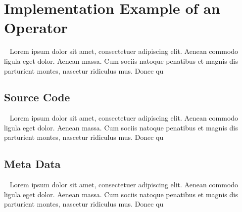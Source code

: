 \graphicspath{{appendix02/bilder/}}


\chapter{Implementation Example of an Operator}\label{chap:beispielimplementierung_operator}
~
Lorem ipsum dolor sit amet, consectetuer adipiscing elit. Aenean commodo ligula eget dolor. Aenean massa. Cum sociis natoque penatibus et magnis dis parturient montes, nascetur ridiculus mus. Donec qu

\section{Source Code}\label{chap:beispielimplementierung_operator_sec:quellcode_beispieloperator}
~
Lorem ipsum dolor sit amet, consectetuer adipiscing elit. Aenean commodo ligula eget dolor. Aenean massa. Cum sociis natoque penatibus et magnis dis parturient montes, nascetur ridiculus mus. Donec qu

\section{Meta Data}\label{chap:beispielimplementierung_operator_sec:metadaten}
~
Lorem ipsum dolor sit amet, consectetuer adipiscing elit. Aenean commodo ligula eget dolor. Aenean massa. Cum sociis natoque penatibus et magnis dis parturient montes, nascetur ridiculus mus. Donec qu
